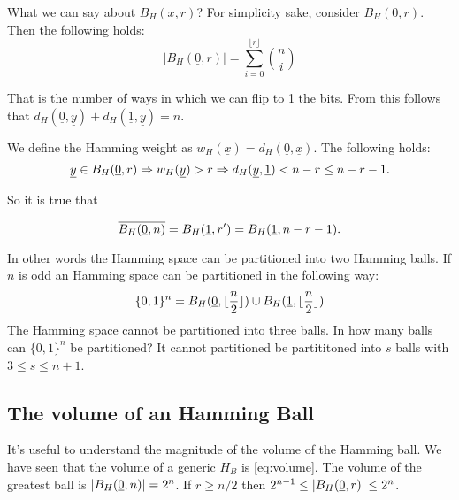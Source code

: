 What we can say about $B_H(\underline{x}, r)$? For simplicity sake, consider $B_H(\underline{0}, r)$. Then the following holds:
\begin{equation}\label{eq:volume}
	|B_H(\underline{0}, r)| = \sum_{i = 0}^{\lfloor r \rfloor} \binom{n}{i}
\end{equation}

That is the number of ways in which we can flip to 1 the bits. From this follows that $d_H(\underline{0}, \underline{y}) + d_H(\underline{1}, \underline{y}) = n$.

We define the Hamming weight as $w_H(\underline{x}) = d_H(\underline{0}, \underline{x})$. The following holds:
$$\underline{y} \in B_H(\underline{0}, r) \Rightarrow w_H(\underline{y}) > r \Rightarrow d_H(\underline{y}, \underline{1}) < n - r \leq n -r - 1.$$

So it is true that

$$\overline{B_H(\underline{0}, n)} = B_H(\underline{1}, r') = B_H(\underline{1}, n - r - 1).$$

In other words the Hamming space can be partitioned into two Hamming balls. If $n$ is odd an Hamming space can be partitioned in the following way: $$\{0, 1\}^n = B_H(\underline{0}, \lfloor \dfrac{n}{2}\rfloor ) \cup B_H(\underline{1}, \lfloor \dfrac{n}{2}\rfloor)$$
The Hamming space cannot be partitioned into three balls. In how many balls can $\{0, 1\}^n$ be partitioned? It cannot partitioned be partititoned into $s$ balls with $3 \leq s \leq n + 1$.

\subsection{The volume of an Hamming Ball}
It's useful to understand the magnitude of the volume of the Hamming ball. We have seen that the volume of a generic $H_B$ is \ref{eq:volume}. The volume of the greatest ball is $|B_H(\underline{0}, n)| = 2^n$. If $r \geq n/2$ then $2^{n-1} \leq |B_H(\underline{0}, r)| \leq 2^n$.
